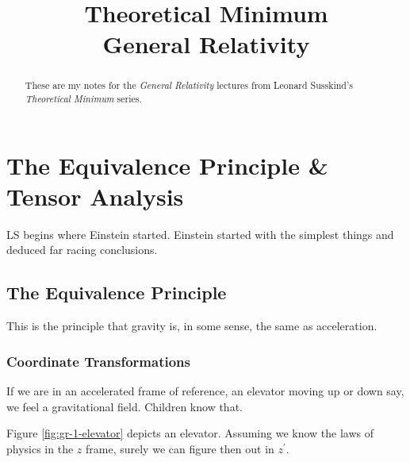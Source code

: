 \documentclass[]{article}
\title{Theoretical Minimum\\General Relativity}
\author{}
\begin{document}
\maketitle

\begin{abstract}
	These are my notes for the \emph{General Relativity}\cite{susskind2012general} lectures from Leonard Susskind's \emph{Theoretical Minimum} series\cite{susskind2007theoretical}.
\end{abstract}

\tableofcontents
\listoffigures
\listoftables
\listoftheorems

\section{The Equivalence Principle \& Tensor Analysis}

LS begins where Einstein started. Einstein started with the simplest things and deduced far racing conclusions.

\subsection{The Equivalence Principle}

This is the principle that gravity is, in some sense, the same as acceleration.

\subsubsection{Coordinate Transformations}

If we are in an accelerated frame of reference, an elevator moving up or down say, we feel a gravitational field. Children know that.

Figure \ref{fig:gr-1-elevator} depicts an elevator. Assuming we know the laws of physics in the $z$ frame, surely we can figure then out in $z^\prime$.
\end{document}

